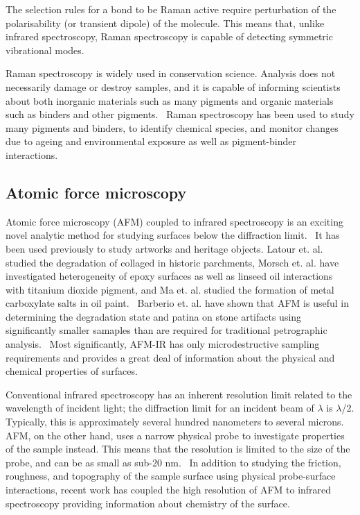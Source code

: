 The selection rules for a bond to be Raman active require perturbation of the polarisability (or transient dipole) of the molecule. This means that, unlike infrared spectroscopy, Raman spectroscopy is capable of detecting symmetric vibrational modes.~\autocite{2018RS,inphotonics}

Raman spectroscopy is widely used in conservation science. Analysis does not necessarily damage or destroy samples, and it is capable of informing scientists about both inorganic materials such as many pigments and organic materials such as binders and other pigments.~\autocite{conti_2016} Raman spectroscopy has been used to study many pigments and binders, to identify chemical species, and monitor changes due to ageing and environmental exposure as well as pigment-binder interactions.~\autocite{conti_2016,matousek_tissue,tomasini_raman,pallipurath2014,pallipurath2013,lazzari,vandenabeele} 

\subsection[Atomic force microscopy]{Atomic force microscopy}
\label{subsection1.2.2}

Atomic force microscopy (AFM) coupled to infrared spectroscopy is an exciting novel analytic method for studying surfaces below the diffraction limit.~\autocite{dazzi2017,kurouski} It has been used previously to study artworks and heritage objects. Latour et. al. studied the degradation of collaged in historic parchments, Morsch et. al. have investigated heterogeneity of epoxy surfaces as well as linseed oil interactions with titanium dioxide pigment, and Ma et. al. studied the formation of metal carboxylate salts in oil paint.~\autocite{latour,Morsch,morsch2016,ma} Barberio et. al. have shown that AFM is useful in determining the degradation state and patina on stone artifacts using significantly smaller samaples than are required for traditional petrographic analysis.~\autocite{Barberio} Most significantly, AFM-IR has only microdestructive sampling requirements and provides a great deal of information about the physical and chemical properties of surfaces.~\autocite{dazzi2017,kurouski}

Conventional infrared spectroscopy has an inherent resolution limit related to the wavelength of incident light; the diffraction limit for an incident beam of $\lambda$ is $\lambda$/2. Typically, this is approximately several hundred nanometers to several microns. AFM, on the other hand, uses a narrow physical probe to investigate properties of the sample instead. This means that the resolution is limited to the size of the probe, and can be as small as sub-20 nm.~\autocite{dazzi2017} In addition to studying the friction, roughness, and topography of the sample surface using physical probe-surface interactions, recent work has coupled the high resolution of AFM to infrared spectroscopy providing information about chemistry of the surface.~\autocite{dazzi2017,kurouski}

